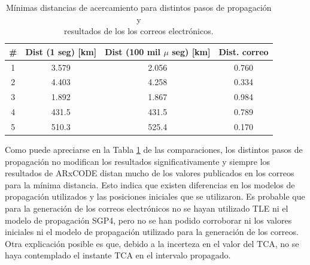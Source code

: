 \begin{table}[!h]
\caption{M\'inimas distancias de acercamiento para distintos pasos de propagaci\'on y\\ resultados de los los correos electr\'onicos.}
\begin{tabular}{cccc}
 \hline \hline
  \rowcolor{lightgray}
 \# & Dist (1 seg) [km] & Dist (100 mil $\mu$ seg) [km] & Dist. correo\\
 \hline \hline
 1 & 3.579 &  2.056 &  0.760  \\
 
 2 & 4.403 & 4.258 & 0.334  \\
 
 3 & 1.892 & 1.867 & 0.984 \\
 
 4 & 431.5 & 431.5 & 0.789 \\
 
 5 & 510.3 & 525.4 & 0.170 \\
 \hline
\end{tabular} %

\label{tab:mailsMinD}
\end{table}

Como puede apreciarse en la Tabla \ref{tab:mailsMinD} de las comparaciones, los distintos pasos de propagaci\'on no modifican los resultados significativamente y siempre los resultados de ARxCODE distan mucho de los valores publicados en los correos para la m\'inima distancia. Esto indica que existen diferencias en los modelos de propagaci\'on utilizados y las posiciones iniciales que se utilizaron. Es probable que para la generaci\'on de los correos electr\'onicos no se hayan utilizado TLE ni el modelo de propagaci\'on SGP4, pero no se han podido corroborar ni los valores iniciales ni el modelo de propagaci\'on utilizado para la generaci\'on de los correos. Otra explicaci\'on posible es que, debido a la incerteza en el valor del TCA, no se haya contemplado el instante TCA en el intervalo propagado.\\

% 
% 


